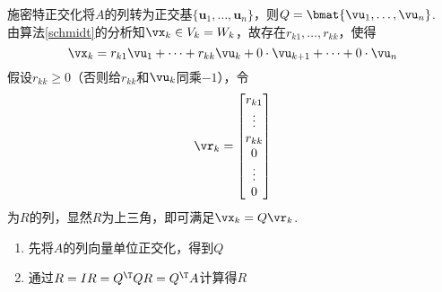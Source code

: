 \begin{analysis}
施密特正交化将$A$的列转为正交基$\{\mathbf{u}_1,\dots,\mathbf{u}_n\}$，则$Q=\bmat{\vu_1,\ldots,\vu_n}$.\\
由算法\ref{schmidt}的分析知$\vx_k\in V_k=W_k$，故存在$r_{k1},\dots,r_{kk}$，使得
\[\vx_k=r_{k1}\vu_1+\cdots+r_{kk}\vu_k+0\cdot\vu_{k+1}+\cdots+0\cdot\vu_n\]
假设$r_{kk}\geq 0$（否则给$r_{kk}$和$\vu_k$同乘$-1$），令
\[\vr_k=\begin{bmatrix}r_{k1}\\\vdots\\r_{kk}\\0\\\vdots\\0\end{bmatrix}\]
为$R$的列，显然$R$为上三角，即可满足$\vx_k=Q\vr_k$.
\end{analysis}
\begin{myalgorithm}[QR分解]
\begin{enumerate}
	\itemsep -3pt
	\item 先将$A$的列向量单位正交化，得到$Q$
	\item 通过$R=IR=Q^\T QR=Q^\T A$计算得$R$
\end{enumerate}
\end{myalgorithm}